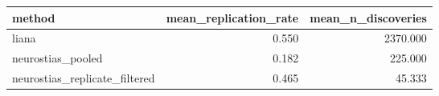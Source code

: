 \begin{tabular}{lrr}
\toprule
method & mean_replication_rate & mean_n_discoveries \\
\midrule
liana & 0.550 & 2370.000 \\
neurostias_pooled & 0.182 & 225.000 \\
neurostias_replicate_filtered & 0.465 & 45.333 \\
\bottomrule
\end{tabular}
